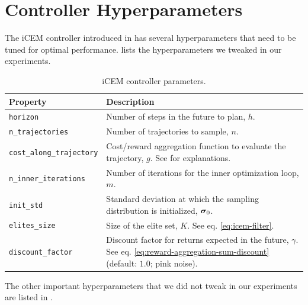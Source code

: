 \chapter{Controller Hyperparameters}
\label{sec:icem-details}
The iCEM controller introduced in  has several hyperparameters that need to be tuned for optimal performance.
 lists the hyperparameters we tweaked in our experiments.

\begin{table}[H]
    \centering
    \begin{tabularx}{\textwidth}{C{4.7cm} L}
        \hline
        Property & Description\\
        \hline
        \texttt{horizon} & Number of steps in the future to plan, \(h\).\\
        \texttt{n\_trajectories} & Number of trajectories to sample, \(n\).\\
        \texttt{cost\_along\_trajectory} & Cost/reward aggregation function to evaluate the trajectory, \(g\). See  for explanations.\\
        \texttt{n\_inner\_iterations} & Number of iterations for the inner optimization loop, \(m\).\\
        \texttt{init\_std} & Standard deviation at which the sampling distribution is initialized, \(\bm{\sigma}_0\).\\
        \texttt{elites\_size} & Size of the elite set, \(K\). See eq. \eqref{eq:icem-filter}.\\
        \texttt{discount\_factor} & Discount factor for returns expected in the future, \(\gamma\). See eq. \eqref{eq:reward-aggregation-sum-discount} (default: \(1.0\); pink noise).\\ 
        \hline
    \end{tabularx}
    \caption{iCEM controller parameters.}
    \label{tab:icem-params}
\end{table}

The other important hyperparameters that we did not tweak in our experiments are listed in .


